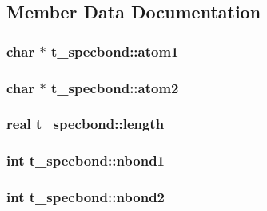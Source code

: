 \subsection{\-Member \-Data \-Documentation}
\hypertarget{structt__specbond_a651d67f7df69464dc46316e87f7dbf9b}{
\subsubsection[{atom1}]{\setlength{\rightskip}{0pt plus 5cm}char $\ast$ {\bf t\-\_\-specbond\-::atom1}}}\label{structt__specbond_a651d67f7df69464dc46316e87f7dbf9b}
\hypertarget{structt__specbond_a0acc53a3a1bc5018d6adfd46b2e2dbc5}{
\subsubsection[{atom2}]{\setlength{\rightskip}{0pt plus 5cm}char $\ast$ {\bf t\-\_\-specbond\-::atom2}}}\label{structt__specbond_a0acc53a3a1bc5018d6adfd46b2e2dbc5}
\hypertarget{structt__specbond_ac9d041ccc3e3019089bb4a2daae7d73d}{
\subsubsection[{length}]{\setlength{\rightskip}{0pt plus 5cm}real {\bf t\-\_\-specbond\-::length}}}\label{structt__specbond_ac9d041ccc3e3019089bb4a2daae7d73d}
\hypertarget{structt__specbond_ac708649e74b4ed4b51bd63da19a48a42}{
\subsubsection[{nbond1}]{\setlength{\rightskip}{0pt plus 5cm}int {\bf t\-\_\-specbond\-::nbond1}}}\label{structt__specbond_ac708649e74b4ed4b51bd63da19a48a42}
\hypertarget{structt__specbond_a62c5af0887c787a58821cb3e0e7e2494}{
\subsubsection[{nbond2}]{\setlength{\rightskip}{0pt plus 5cm}int {\bf t\-\_\-specbond\-::nbond2}}}\label{structt__specbond_a62c5af0887c787a58821cb3e0e7e2494}
